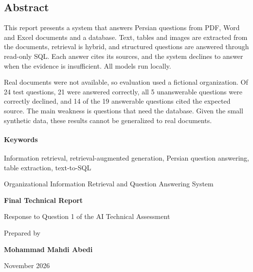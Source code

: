\documentclass[a4paper,12pt,oneside]{book}
\newcommand{\reportlatintitle}{Organizational Information Retrieval and Question Answering System}
\begin{document}
\clearpage
\begin{latin}
\thispagestyle{empty}
\section*{Abstract}

This report presents a system that answers Persian questions from PDF, Word and Excel documents and a database. Text, tables and images are extracted from the documents, retrieval is hybrid, and structured questions are answered through read-only SQL. Each answer cites its sources, and the system declines to answer when the evidence is insufficient. All models run locally.

Real documents were not available, so evaluation used a fictional organization. Of 24 test questions, 21 were answered correctly, all 5 unanswerable questions were correctly declined, and 14 of the 19 answerable questions cited the expected source. The main weakness is questions that need the database. Given the small synthetic data, these results cannot be generalized to real documents.

\paragraph{Keywords}
Information retrieval, retrieval-augmented generation, Persian question answering, table extraction, text-to-SQL

\begin{titlepage}
\centering
\vspace*{35mm}
{\latintitlefont \reportlatintitle\par}
\vskip 15mm
{\Large\bfseries Final Technical Report\par}
\vskip 4mm
{\large Response to Question 1 of the AI Technical Assessment\par}
\vfill
{\large Prepared by\par}
\vskip 4mm
{\Large\bfseries Mohammad Mahdi Abedi\par}
\vskip 15mm
{\large November 2026\par}
\vspace*{15mm}
\end{titlepage}
\end{latin}
\end{document}
